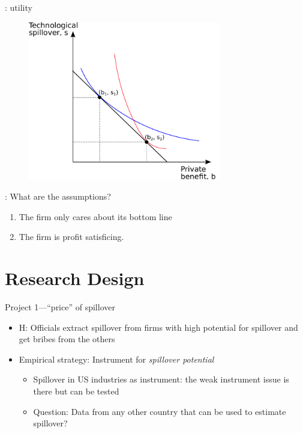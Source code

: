 \documentclass[14pt]{beamer}
\begin{document}
\begin{frame}{\secname: utility}
\begin{figure}
	\centering
    \includegraphics[width=0.75\textwidth, height=0.75\textheight,keepaspectratio]{../figure/indifference_curve}
    \label{fig:indifference_curve}
\end{figure}
\end{frame}

\begin{frame}{\secname: What are the assumptions?}
\begin{enumerate}
\item<1-> The firm only cares about its bottom line
\item<2-> The firm is profit satisficing.
\end{enumerate}
\end{frame}

\section{Research Design}

\begin{frame}{Project 1---``price'' of spillover}
\begin{itemize}[<+->]
\item H: Officials extract spillover from firms with high potential for spillover and get bribes from the others
\item Empirical strategy: Instrument for \textit{spillover potential}
\begin{itemize}[<+->]
\item Spillover in US industries as instrument: the weak instrument issue is there but can be tested
\item Question: Data from any other country that can be used to estimate spillover?
\end{itemize}
\end{itemize}
\end{frame}
\end{document}
